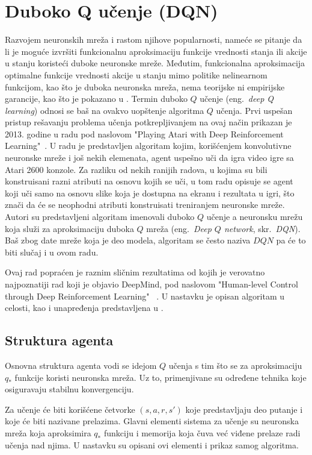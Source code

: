 \chapter{Duboko Q učenje (DQN)}
\label{ch:dqn}

Razvojem neuronskih mreža i rastom njihove popularnosti, nameće se pitanje da li je moguće izvršiti funkcionalnu aproksimaciju funkcije vrednosti stanja ili akcije u stanju koristeći duboke neuronske mreže. Međutim, funkcionalna aproksimacija optimalne funkcije vrednosti akcije u stanju mimo politike nelinearnom funkcijom, kao što je duboka neuronska mreža, nema teorijske ni empirijske garancije, kao što je pokazano u \cite{q_nn_div}.  Termin duboko $Q$ učenje (eng.~{\em deep Q learning}) odnosi se baš na ovakvo uopštenje algoritma $Q$ učenja. Prvi uspešan pristup rešavanju problema učenja potkrepljivanjem na ovaj način prikazan je 2013. godine u radu pod naslovom "Playing Atari with Deep Reinforcement Learning"~\cite{dqn_mnih}. U radu je predstavljen algoritam kojim, korišćenjem konvolutivne neuronske mreže i još nekih elemenata, agent uspešno uči da igra video igre sa Atari 2600 konzole. Za razliku od nekih ranijih radova, u kojima su bili konstruisani razni atributi na osnovu kojih se uči, u tom radu opisuje se agent koji uči samo na osnovu slike koja je dostupna na ekranu i rezultata u igri, što znači da će se neophodni atributi konstruisati treniranjem neuronske mreže. 
Autori su predstavljeni algoritam imenovali duboko $Q$ učenje a neuronsku mrežu koja služi za aproksimaciju duboka $Q$ mreža (eng.~{\em Deep $Q$ network}, skr.~{\em DQN}). Baš zbog date mreže koja je deo modela, algoritam se često naziva $DQN$ pa će to biti slučaj i u ovom radu.
\par 
Ovaj rad popraćen je raznim sličnim rezultatima od kojih je verovatno najpoznatiji rad koji je objavio DeepMind, pod naslovom "Human-level Control through Deep Reinforcement Learning" ~\cite{dqn_dm}.  U nastavku je opisan algoritam u celosti, kao i unapređenja predstavljena u \cite{dqn_dm}.

\section{Struktura agenta}

Osnovna struktura agenta vodi se idejom $Q$ učenja s tim što se za aproksimaciju $q_*$ funkcije koristi neuronska mreža. Uz to, primenjivane su određene tehnika koje osiguravaju stabilnu konvergenciju. 
\par 
Za učenje će biti korišćene četvorke $(s, a, r, s')$ koje predstavljaju deo putanje i koje će biti nazivane prelazima. Glavni elementi sistema za učenje su neuronska mreža koja aproksimira $q_*$ funkciju i memorija koja čuva već viđene prelaze radi učenja nad njima. U nastavku su opisani ovi elementi i prikaz samog algoritma.

